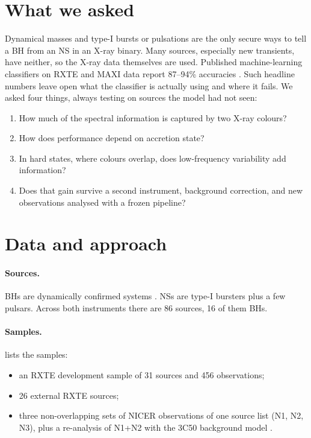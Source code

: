 \documentclass[11pt,a4paper]{article}
\begin{document}
\section{What we asked}
Dynamical masses and type-I bursts or pulsations are the only secure ways to tell a BH from an NS in an X-ray binary.
Many sources, especially new transients, have neither, so the X-ray data themselves are used. Published
machine-learning classifiers on RXTE and MAXI data report 87--94\% accuracies
\citep{Pattnaik2021,deBeurs2022,Garg2026}. Such headline numbers leave open what the classifier is actually using and
where it fails. We asked four things, always testing on sources the model had not seen:
\begin{enumerate}[leftmargin=1.4em]
\item How much of the spectral information is captured by two X-ray colours?
\item How does performance depend on accretion state?
\item In hard states, where colours overlap, does low-frequency variability add information?
\item Does that gain survive a second instrument, background correction, and new observations analysed with a frozen
pipeline?
\end{enumerate}

\section{Data and approach}

\paragraph{Sources.}
BHs are dynamically confirmed systems \citep{CorralSantana2016,Marcel2026}. NSs are type-I bursters
\citep{Galloway2008,Galloway2020} plus a few pulsars. Across both instruments there are 86 sources, 16 of them BHs.

\paragraph{Samples.}
 lists the samples:
\begin{itemize}[leftmargin=1.4em]
\item an RXTE development sample of 31 sources and 456 observations;
\item 26 external RXTE sources;
\item three non-overlapping sets of NICER observations of one source list (N1, N2, N3), plus a re-analysis of N1+N2
with the 3C50 background model \citep{Remillard2022}.
\end{itemize}
\end{document}
